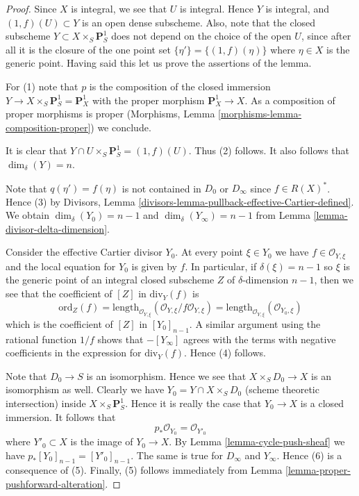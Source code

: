 \documentclass[10pt,a4paper]{amsart}
\theoremstyle{plain}
\theoremstyle{definition}
\theoremstyle{remark}
\numberwithin{equation}{subsection}
\begin{document}
\begin{proof}
Since $X$ is integral, we see that $U$ is integral.
Hence $Y$ is integral, and $(1, f)(U) \subset Y$ is an open dense subscheme.
Also, note that the closed subscheme $Y \subset X \times_S \mathbf{P}^1_S$
does not depend on the choice of the open $U$, since after all it is
the closure of the one point set $\{\eta'\} = \{(1, f)(\eta)\}$
where $\eta \in X$ is the generic point. Having said this let us
prove the assertions of the lemma.

\medskip\noindent
For (1) note that $p$ is the composition of the closed immersion
$Y \to X \times_S \mathbf{P}^1_S = \mathbf{P}^1_X$ with the proper
morphism $\mathbf{P}^1_X \to X$. As a composition of proper morphisms
is proper (Morphisms, Lemma \ref{morphisms-lemma-composition-proper})
we conclude.

\medskip\noindent
It is clear that $Y \cap U \times_S \mathbf{P}^1_S = (1, f)(U)$.
Thus (2) follows. It also follows that $\dim_\delta(Y) = n$.

\medskip\noindent
Note that $q(\eta') = f(\eta)$ is not contained in $D_0$ or $D_\infty$
since $f \in R(X)^*$. Hence (3) by
Divisors, Lemma \ref{divisors-lemma-pullback-effective-Cartier-defined}.
We obtain $\dim_\delta(Y_0) = n - 1$
and $\dim_\delta(Y_\infty) = n - 1$ from
Lemma \ref{lemma-divisor-delta-dimension}.

\medskip\noindent
Consider the effective Cartier divisor $Y_0$.
At every point $\xi \in Y_0$ we have $f \in \mathcal{O}_{Y, \xi}$ and
the local equation for $Y_0$ is given by $f$.
In particular, if $\delta(\xi) = n - 1$ so $\xi$ is the generic point
of an integral closed subscheme $Z$ of $\delta$-dimension $n - 1$,
then we see that the coefficient of $[Z]$ in $\text{div}_Y(f)$ is
$$
\text{ord}_Z(f) =
\text{length}_{\mathcal{O}_{Y, \xi}}
(\mathcal{O}_{Y, \xi}/f\mathcal{O}_{Y, \xi}) =
\text{length}_{\mathcal{O}_{Y, \xi}}
(\mathcal{O}_{Y_0, \xi})
$$
which is the coefficient of $[Z]$ in $[Y_0]_{n - 1}$. A similar
argument using the rational function $1/f$ shows that
$-[Y_\infty]$ agrees with the terms with negative coefficients in
the expression for $\text{div}_Y(f)$. Hence (4) follows.

\medskip\noindent
Note that $D_0 \to S$ is an isomorphism. Hence we see that
$X \times_S D_0 \to X$ is an isomorphism as well. Clearly
we have $Y_0 = Y \cap X \times_S D_0$ (scheme theoretic intersection)
inside $X \times_S \mathbf{P}^1_S$. Hence it is really the case that
$Y_0 \to X$ is a closed immersion. It follows that
$$
p_*\mathcal{O}_{Y_0} = \mathcal{O}_{Y'_0}
$$
where $Y'_0 \subset X$ is the image of $Y_0 \to X$.
By Lemma \ref{lemma-cycle-push-sheaf} we
have $p_*[Y_0]_{n - 1} = [Y'_0]_{n - 1}$. The same
is true for $D_\infty$ and $Y_\infty$. Hence (6) is a consequence of (5).
Finally, (5) follows immediately from
Lemma \ref{lemma-proper-pushforward-alteration}.
\end{proof}
\end{document}
